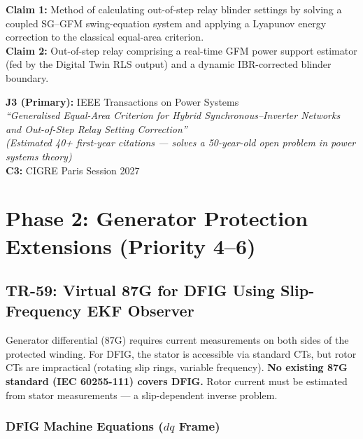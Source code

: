 \documentclass[12pt, a4paper]{report}
\begin{document}
\begin{tcolorbox}[ipbox, title={IP — Patent Family P3}]
\textbf{Claim 1:} Method of calculating out-of-step relay blinder settings by solving a coupled SG--GFM swing-equation system and applying a Lyapunov energy correction to the classical equal-area criterion.\\[4pt]
\textbf{Claim 2:} Out-of-step relay comprising a real-time GFM power support estimator (fed by the Digital Twin RLS output) and a dynamic IBR-corrected blinder boundary.
\end{tcolorbox}

\begin{tcolorbox}[pubbox, title={Publications — TR-58}]
\textbf{J3 (Primary):} IEEE Transactions on Power Systems\\
\textit{``Generalised Equal-Area Criterion for Hybrid Synchronous--Inverter Networks and Out-of-Step Relay Setting Correction''}\\
\small\textit{(Estimated 40+ first-year citations — solves a 50-year-old open problem in power systems theory)}\\[4pt]
\textbf{C3:} CIGRE Paris Session 2027
\end{tcolorbox}

\chapter{Phase 2: Generator Protection Extensions (Priority 4--6)}

\section{TR-59: Virtual 87G for DFIG Using Slip-Frequency EKF Observer}

\begin{tcolorbox}[gapbox, title={Research Gap — TR-59}]
Generator differential (87G) requires current measurements on both sides of the protected winding. For DFIG, the stator is accessible via standard CTs, but rotor CTs are impractical (rotating slip rings, variable frequency). \textbf{No existing 87G standard (IEC 60255-111) covers DFIG.} Rotor current must be estimated from stator measurements — a slip-dependent inverse problem.
\end{tcolorbox}

\subsection{DFIG Machine Equations ($dq$ Frame)}
\end{document}
